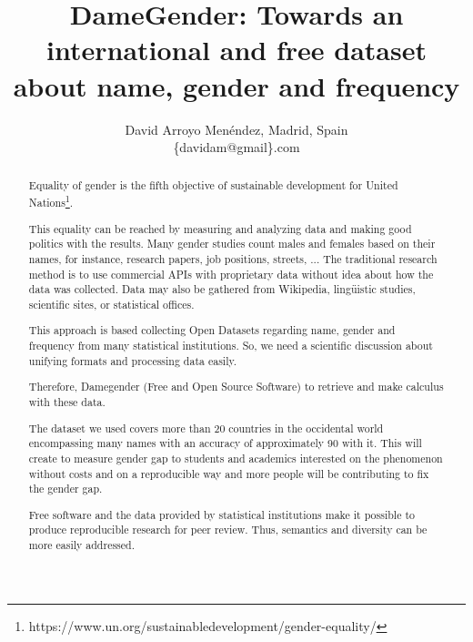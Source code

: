 \documentclass[a4paper]{article}
\title{DameGender: Towards an international and free dataset about name, gender and frequency}
\author{
David Arroyo Menéndez, Madrid, Spain \\ \{davidam@gmail\}.com
}
\begin{document}
\maketitle

\begin{abstract}

  Equality of gender is the fifth objective of sustainable development
  for United
  Nations\footnote{https://www.un.org/sustainabledevelopment/gender-equality/}.

  This equality can be reached by measuring and analyzing data
  and making good politics with the results. Many gender studies
  count males and females based on their names, for
  instance, research papers, job positions, streets, ... The
  traditional research method is to use commercial APIs with
  proprietary data without idea about how the data was collected.
  Data may also be gathered from Wikipedia, lingüistic studies,
  scientific sites, or statistical offices.


  This approach is based collecting Open Datasets regarding name,
  gender and frequency from many statistical institutions. So, we
  need a scientific discussion about unifying formats and processing
  data easily.

  Therefore, Damegender (Free and Open Source Software) to retrieve
  and make calculus with these data.


  The dataset we used covers more than 20 countries in the occidental
  world encompassing many names with an accuracy of approximately 90%
  with it. This will create to measure gender gap to students and
  academics interested on the phenomenon without costs and on a
  reproducible way and more people will be contributing to fix the
  gender gap.


  Free software and the data provided by statistical institutions make
  it possible to produce reproducible research for peer review. Thus,
  semantics and diversity can be more easily addressed.
  
\end{abstract}
\end{document}
